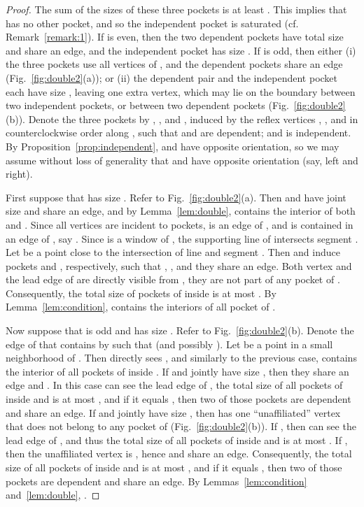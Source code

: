 \documentclass[12pt]{article}
\begin{document}
\begin{proof}
The sum of the sizes of these three pockets is at least .
This implies that  has no other pocket, and so the independent pocket is saturated (cf. Remark~\ref{remark:1}). If  is even, then the two dependent pockets have total size  and share an edge, and the independent pocket has size .
If  is odd, then either (i) the three pockets use all  vertices of , and the dependent pockets share an edge (Fig.~\ref{fig:double2}(a)); or (ii) the dependent pair and the independent pocket each have size , leaving one extra vertex, which may lie on the boundary between two independent pockets, or between two dependent pockets (Fig.~\ref{fig:double2}(b)).
Denote the three pockets by , , and , induced by the reflex vertices , , and  in counterclockwise order along , such that  and  are dependent; and  is independent.
By Proposition~\ref{prop:independent},  and  have opposite orientation, so we may assume without loss of generality that  and  have opposite orientation (say, left and right).

First suppose that  has size . Refer to Fig.~\ref{fig:double2}(a). Then  and  have joint size  and share an edge, and by Lemma~\ref{lem:double},  contains the interior of both  and . Since all  vertices are incident to pockets,  is an edge of , and  is contained in an edge of , say . Since  is a window of , the supporting line of  intersects segment . Let  be a point close to the intersection of line  and segment . Then  and  induce pockets  and , respectively, such that , , and they share an edge. Both vertex  and the lead edge of  are directly visible from , they are not part of any pocket of . Consequently, the total size of pockets of  inside  is at most . By Lemma~\ref{lem:condition},  contains the interiors of all pocket of .

Now suppose that  is odd and  has size . Refer to Fig.~\ref{fig:double2}(b).
Denote the edge of  that contains  by  such that  (and possibly ).
Let  be a point in a small neighborhood of . Then  directly sees ,
and similarly to the previous case,  contains the interior of all pockets of  inside . If  and  jointly have size , then they share an edge and .
In this case  can see the lead edge of , the total size of all pockets of  inside  and  is at most , and if it equals , then two of those pockets are dependent and share an edge. If  and  jointly have size , then  has one ``unaffiliated'' vertex that does not belong to any pocket of  (Fig.~\ref{fig:double2}(b)). If , then  can see the lead edge of , and thus the total size of all pockets of  inside  and  is at most . If , then the unaffiliated vertex is , hence  and  share an edge. Consequently, the total size of all pockets of  inside  and  is at most , and if it equals , then two of those pockets are dependent and share an edge. By Lemmas~\ref{lem:condition} and~\ref{lem:double}, .
\end{proof}
\end{document}
